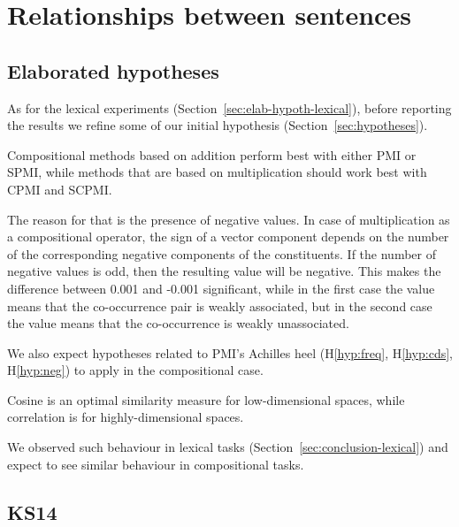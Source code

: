 \chapter{Relationships between sentences}
\label{sec:sentential}


\section{Elaborated hypotheses}
\label{sec:elab-hypoth-comp}

As for the lexical experiments (Section~\ref{sec:elab-hypoth-lexical}), before reporting the results we refine some of our initial hypothesis (Section~\ref{sec:hypotheses}).

\begin{hyp}
  \label{hyp:comp-pmi-cpmi}
  Compositional methods based on addition perform best with either PMI or SPMI, while methods that are based on multiplication should work best with CPMI and SCPMI.
\end{hyp}

The reason for that is the presence of negative values. In case of multiplication as a compositional operator, the sign of a vector component depends on the number of the corresponding negative components of the constituents. If the number of negative values is odd, then the resulting value will be negative. This makes the difference between 0.001 and -0.001 significant, while in the first case the value means that the co-occurrence pair is weakly associated, but in the second case the value means that the co-occurrence is weakly unassociated.

We also expect hypotheses related to PMI's Achilles heel (H\ref{hyp:freq}, H\ref{hyp:cds}, H\ref{hyp:neg}) to apply in the compositional case.

\begin{hyp}
  \label{hyp:similarity}
  Cosine is an optimal similarity measure for low-dimensional spaces, while correlation is for highly-dimensional spaces.
\end{hyp}

We observed such behaviour in lexical tasks (Section~\ref{sec:conclusion-lexical}) and expect to see similar behaviour in compositional tasks.

\section{KS14}
\label{sec:ks14}

